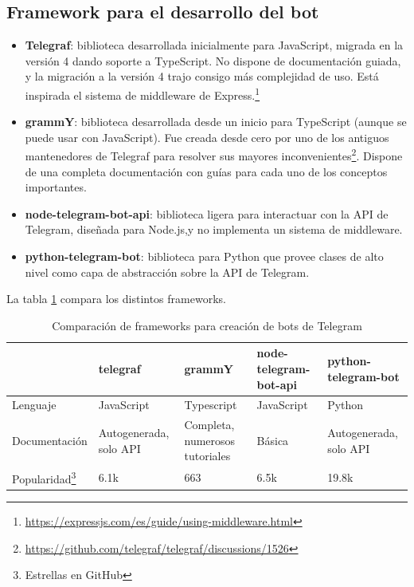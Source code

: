 \subsection{Framework para el desarrollo del bot}
\begin{itemize}
    \item \textbf{Telegraf}: biblioteca desarrollada inicialmente para JavaScript, migrada en la versión 4 dando soporte a TypeScript. No dispone de documentación guiada, y la migración a la versión 4 trajo consigo más complejidad de uso. Está inspirada el sistema de middleware de Express.\footnote{\url{https://expressjs.com/es/guide/using-middleware.html}}
    \item \textbf{grammY}: biblioteca desarrollada desde un inicio para TypeScript (aunque se puede usar con JavaScript). Fue creada desde cero por uno de los antiguos mantenedores de Telegraf para resolver sus mayores inconvenientes\footnote{\url{https://github.com/telegraf/telegraf/discussions/1526}}. Dispone de una completa documentación con guías para cada uno de los conceptos importantes.
    \item \textbf{node-telegram-bot-api}: biblioteca ligera para interactuar con la API de Telegram, diseñada para Node.js,y no implementa un sistema de middleware.
    \item \textbf{python-telegram-bot}: biblioteca para Python que provee clases de alto nivel como capa de abstracción sobre la API de Telegram.
\end{itemize}

La tabla \ref{tab:comparacionFrameworks} compara los distintos frameworks.

\begin{table}
\begin{minipage}{\textwidth}
\begin{tabularx}{\textwidth}{|l|X|X|X|X|}
\hline
& telegraf & grammY & node-telegram-bot-api & python-telegram-bot \\
\hline
Lenguaje & JavaScript & Typescript & JavaScript & Python \\
\hline
Documentación & Autogenerada, solo API & Completa, numerosos tutoriales & Básica & Autogenerada, solo API \\
\hline
Popularidad\footnote{Estrellas en GitHub} & 6.1k & 663 & 6.5k & 19.8k \\
\hline
\end{tabularx}
\end{minipage}
\caption{Comparación de frameworks para creación de bots de Telegram}\label{tab:comparacionFrameworks}
\end{table}

